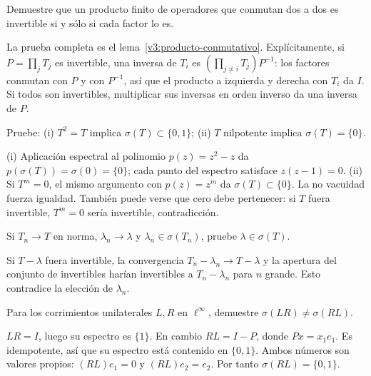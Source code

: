 \begin{ejercicio}\label{ej:v3-l08-1}
Demuestre que un producto finito de operadores que conmutan dos a dos es invertible si y sólo si cada factor lo es.
\end{ejercicio}
\begin{solucion}
La prueba completa es el lema~\ref{v3:producto-conmutativo}. Explícitamente, si $P=\prod_jT_j$ es invertible, una inversa de $T_i$ es $(\prod_{j\ne i}T_j)P^{-1}$: los factores conmutan con $P$ y con $P^{-1}$, así que el producto a izquierda y derecha con $T_i$ da $I$. Si todos son invertibles, multiplicar sus inversas en orden inverso da una inversa de $P$.
\end{solucion}

\begin{ejercicio}\label{ej:v3-l08-2}
Pruebe: (i) $T^2=T$ implica $\sigma(T)\subset\{0,1\}$; (ii) $T$ nilpotente implica $\sigma(T)=\{0\}$.
\end{ejercicio}
\begin{solucion}
(i) Aplicación espectral al polinomio $p(z)=z^2-z$ da $p(\sigma(T))=\sigma(0)=\{0\}$; cada punto del espectro satisface $z(z-1)=0$. (ii) Si $T^m=0$, el mismo argumento con $p(z)=z^m$ da $\sigma(T)\subset\{0\}$. La no vacuidad fuerza igualdad. También puede verse que cero debe pertenecer: si $T$ fuera invertible, $T^m=0$ sería invertible, contradicción.
\end{solucion}

\begin{ejercicio}\label{ej:v3-l08-3}
Si $T_n\to T$ en norma, $\lambda_n\to\lambda$ y $\lambda_n\in\sigma(T_n)$, pruebe $\lambda\in\sigma(T)$.
\end{ejercicio}
\begin{solucion}
Si $T-\lambda$ fuera invertible, la convergencia $T_n-\lambda_n\to T-\lambda$ y la apertura del conjunto de invertibles harían invertibles a $T_n-\lambda_n$ para $n$ grande. Esto contradice la elección de $\lambda_n$.
\end{solucion}

\begin{ejercicio}\label{ej:v3-l08-4}
Para los corrimientos unilaterales $L,R$ en $\ell^\infty$, demuestre $\sigma(LR)\ne\sigma(RL)$.
\end{ejercicio}
\begin{solucion}
$LR=I$, luego su espectro es $\{1\}$. En cambio $RL=I-P$, donde $Px=x_1e_1$. Es idempotente, así que su espectro está contenido en $\{0,1\}$. Ambos números son valores propios: $(RL)e_1=0$ y $(RL)e_2=e_2$. Por tanto $\sigma(RL)=\{0,1\}$.
\end{solucion}


